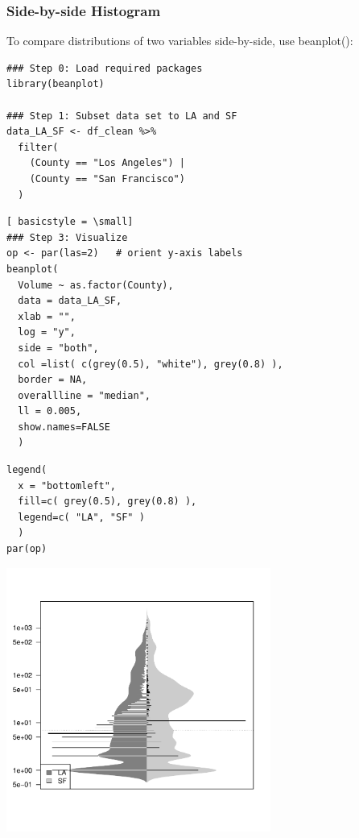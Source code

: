 \begin{frame}
  \frametitle{Side-by-side Histogram}

To compare distributions of two variables side-by-side, use \ttfamily beanplot(): \normalfont

  \begin{lstlisting}
### Step 0: Load required packages
library(beanplot)

### Step 1: Subset data set to LA and SF
data_LA_SF <- df_clean %>%
  filter( 
    (County == "Los Angeles") | 
    (County == "San Francisco") 
  ) 
  \end{lstlisting}

\newpage
  \begin{lstlisting}[ basicstyle = \small]
### Step 3: Visualize
op <- par(las=2)   # orient y-axis labels
beanplot(
  Volume ~ as.factor(County), 
  data = data_LA_SF, 
  xlab = "",
  log = "y",
  side = "both", 
  col =list( c(grey(0.5), "white"), grey(0.8) ), 
  border = NA, 
  overallline = "median", 
  ll = 0.005,
  show.names=FALSE
  )
  \end{lstlisting}

\newpage
  \begin{lstlisting}
legend(
  x = "bottomleft",
  fill=c( grey(0.5), grey(0.8) ), 
  legend=c( "LA", "SF" )
  )
par(op)
  \end{lstlisting}

\newpage
        \begin{center}
           \includegraphics[width=0.65\textwidth]{images/beanplot.pdf}
        \end{center}

\end{frame}

